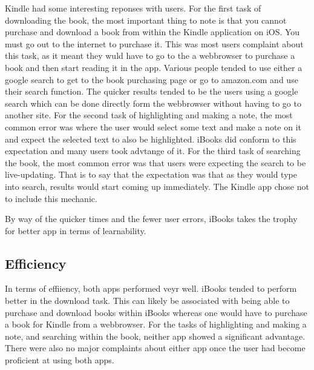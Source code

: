 \documentclass[journal,letterpaper]{article}
\begin{document}
    Kindle had some interesting reponses with users. For the first task of downloading the book, the most important thing to note is that you cannot purchase and download a book from within the Kindle application on iOS. You must go out to the internet to purchase it. This was most users complaint about this task, as it meant they wuld have to go to the a webbrowser to purchase a book and then start reading it in the app. Various people tended to use either a google search to get to the book purchasing page or go to amazon.com and use their search function. The quicker results tended to be the users using a google search which can be done directly form the webbrowser without having to go to another site. For the second task of highlighting and making a note, the most common error was where the user would select some text and make a note on it and expect the selected text to also be highlighted. iBooks did conform to this expectation and many users took advtange of it. For the third task of searching the book, the most common error was that users were expecting the search to be live-updating. That is to say that the expectation was that as they would type into search, results would start coming up immediately. The Kindle app chose not to include this mechanic.

    By way of the quicker times and the fewer user errors, iBooks takes the trophy for better app in terms of learnability.

    \subsection{Efficiency}
    In terms of effiiency, both apps performed veyr well. iBooks tended to perform better in the download task. This can likely be associated with being able to purchase and download books within iBooks whereas one would have to purchase a book for Kindle from a webbrowser. For the tasks of highlighting and making a note, and searching within the book, neither app showed a significant advantage. There were also no major complaints about either app once the user had become proficient at using both apps. 
\end{document}
